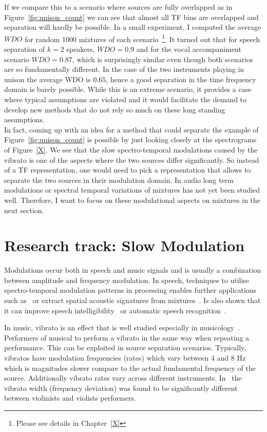 If we compare this to a scenario where sources are fully overlapped as in Figure~\ref{fig:unison_count} we can see that almost all TF bins are overlapped and separation will hardly be possible.
In a small experiment, I computed the average \(WDO\) for random 1000 mixtures of each scenario~\footnote{Please see details in Chapter~\ref{X}}.
It turned out that for speech separation of \(k=2\) speakers, \(WDO=0.9\) and for the vocal accompaniment scenario \(WDO=0.87\), which is surprisingly similar even though both scenarios are so fundamentally different.
In the case of the two instruments playing in unison the average WDO is \(0.65\), hence a good separation in the time frequency domain is barely possible.
While this is an extreme scenario, it provides a case where typical assumptions are violated and it would facilitate the demand to develop new methods that do not rely so much on these long standing assumptions.
\\
In fact, coming up with an idea for a method that could separate the example of Figure~\ref{fig:unison_count} is possible by just looking closely at the spectrograms of Figure~\ref{X}.
We see that the slow spectro-temporal modulations caused by the vibrato is one of the aspects where the two sources differ significantly.
So instead of a TF representation, one would need to pick a representation that allows to separate the two sources in their modulation domain.
In audio long term modulations or spectral temporal variations of mixtures has not yet been studied well.
Therefore, I want to focus on these modulational aspects on mixtures in the next section.

\hypertarget{research-track-modulations}{%
\section{Research track: Slow Modulation}\label{research-track-modulations}}

Modulations occur both in speech and music signals and is usually a combination between amplitude and frequency modulation.
In speech, techniques to utilise spectro-temporal modulation patterns in processing enables further applications such as~\cite{mesgarani04} or extract spatial acoustic signatures from mixtures~\cite{sukittanon06}.
Is also shown that it can improve speech intelligibility~\cite{elhilali03} or automatic speech recognition~\cite{kingsbury98}.

In music, vibrato is an effect that is well studied especially in musicology~\cite{A, B, C, D, E}.
Performers of musical to perform a vibrato in the same way when repeating a performance. This can be exploited in
source separation scenarios.
Typically, vibratos have modulation frequencies (rates) which vary between 4 and 8 Hz which is magnitudes slower compare to the actual fundamental frequency of the source.
Additionally vibrato rates vary across different instruments.
In~\cite{macleod2006} the vibrato width (frequency deviation) was found to be significantly different between violinists and violists performers.\\

